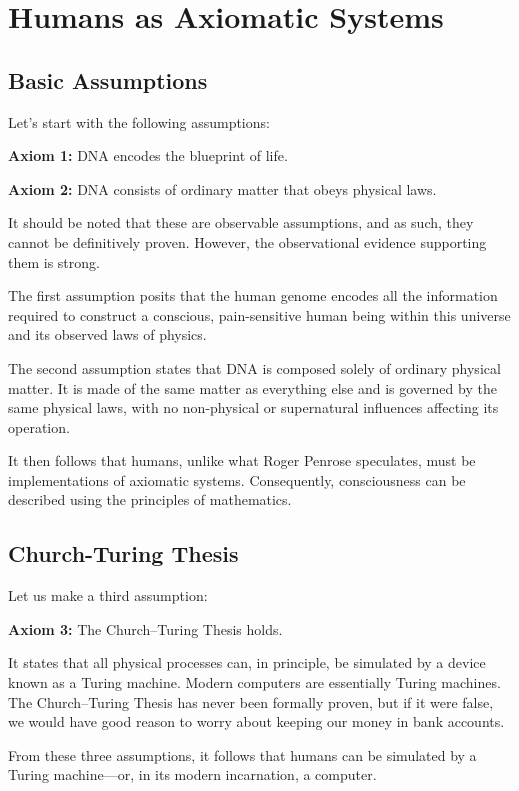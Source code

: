 \chapter{Humans as Axiomatic Systems}
\label{chap:humans-as-axiomatic-systems}

\section{Basic Assumptions}

Let's start with the following assumptions:

\textbf{Axiom 1:} DNA encodes the blueprint of life.

\textbf{Axiom 2:} DNA consists of ordinary matter that obeys physical laws.


It should be noted that these are observable assumptions, and as such, they cannot be definitively proven. However, the observational evidence supporting them is strong.

The first assumption posits that the human genome encodes all the information required to construct a conscious, pain-sensitive human being within this universe and its observed laws of physics.

The second assumption states that DNA is composed solely of ordinary physical matter. It is made of the same matter as everything else and is governed by the same physical laws, with no non-physical or supernatural influences affecting its operation.

It then follows that humans, unlike what Roger Penrose speculates, must be implementations of axiomatic systems. Consequently, consciousness can be described using the principles of mathematics.


\section{Church-Turing Thesis}

Let us make a third assumption:

\textbf{Axiom 3:} The Church--Turing Thesis holds.


It states that all physical processes can, in principle, be simulated by a device known as a Turing machine. Modern computers are essentially Turing machines. The Church--Turing Thesis has never been formally proven, but if it were false, we would have good reason to worry about keeping our money in bank accounts.

From these three assumptions, it follows that humans can be simulated by a Turing machine---or, in its modern incarnation, a computer. 


